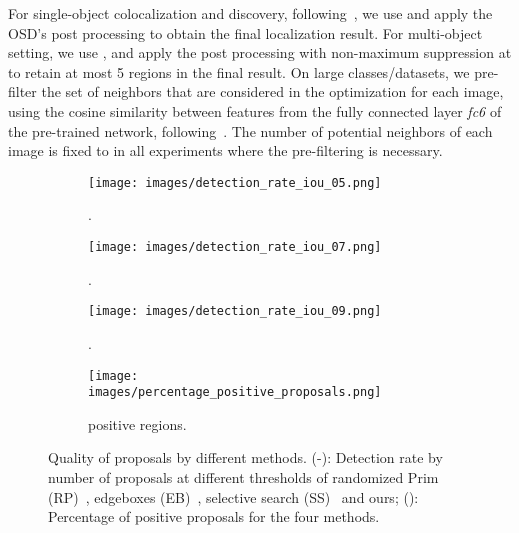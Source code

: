 \documentclass[runningheads]{llncs}
\begin{document}
For single-object colocalization and discovery, following~\cite{Vo2019UnsupOptim}, we use  and apply the OSD's post processing to obtain the final localization result. For multi-object setting, we use ,  and apply the post processing with non-maximum suppression at  to retain at most 5 regions in the final result. 
On large classes/datasets, we pre-filter the set of neighbors that are considered in the optimization for each image, using the cosine similarity between features from the fully connected layer \textit{fc6} of the pre-trained network, following~\cite{Babenko2014neuralcode}. The number of potential neighbors of each image is fixed to  in all experiments where the pre-filtering is necessary. 

\begin{figure*}[tb]
	\begin{center}
	    \begin{subfigure}{0.24\textwidth}
			\texttt{[image: images/detection\_rate\_iou\_05.png]}
			\caption{\small .}
			\label{fig:iou05}
		\end{subfigure}
		\begin{subfigure}{0.24\textwidth}
			\texttt{[image: images/detection\_rate\_iou\_07.png]}
			\caption{\small .}
			\label{fig:iou07}
		\end{subfigure}
		\begin{subfigure}{0.24\textwidth} \texttt{[image: images/detection\_rate\_iou\_09.png]}
			\caption{\small .}
			\label{fig:iou09}
		\end{subfigure}
		\begin{subfigure}{0.24\textwidth}
			\texttt{[image: images/percentage\_positive\_proposals.png]}
			\caption{\small positive regions.}
			\label{fig:percentage_positive_proposals}
		\end{subfigure}
	\end{center}
	\caption{\small Quality of proposals by different methods. (\protect{}-\protect{}): Detection rate by number of proposals at different  thresholds of randomized Prim (RP)~\cite{Manen2013prim}, edgeboxes (EB)~\cite{zitnick2014edge}, selective search (SS)~\cite{uijlings2013selective} and ours; (\protect{}): Percentage of positive proposals for the four methods.}
	\label{fig:quality_of_proposals}
\end{figure*}
\end{document}
